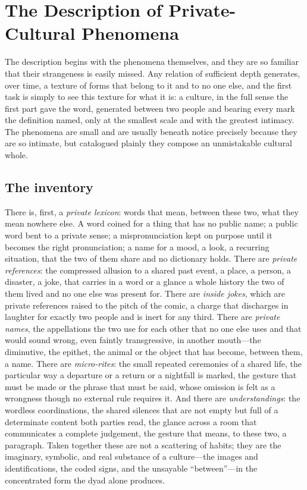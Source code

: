 \section{The Description of Private-Cultural Phenomena}
\label{p24:sec:description}

\noindent
The description begins with the phenomena themselves, and they are so familiar that their strangeness is easily missed. Any relation of sufficient depth generates, over time, a texture of forms that belong to it and to no one else, and the first task is simply to see this texture for what it is: a culture, in the full sense the first part gave the word, generated between two people and bearing every mark the definition named, only at the smallest scale and with the greatest intimacy. The phenomena are small and are usually beneath notice precisely because they are so intimate, but catalogued plainly they compose an unmistakable cultural whole.

\subsection*{The inventory}

There is, first, a \emph{private lexicon}: words that mean, between these two, what they mean nowhere else. A word coined for a thing that has no public name; a public word bent to a private sense; a mispronunciation kept on purpose until it becomes the right pronunciation; a name for a mood, a look, a recurring situation, that the two of them share and no dictionary holds. There are \emph{private references}: the compressed allusion to a shared past event, a place, a person, a disaster, a joke, that carries in a word or a glance a whole history the two of them lived and no one else was present for. There are \emph{inside jokes}, which are private references raised to the pitch of the comic, a charge that discharges in laughter for exactly two people and is inert for any third. There are \emph{private names}, the appellations the two use for each other that no one else uses and that would sound wrong, even faintly transgressive, in another mouth---the diminutive, the epithet, the animal or the object that has become, between them, a name. There are \emph{micro-rites}: the small repeated ceremonies of a shared life, the particular way a departure or a return or a nightfall is marked, the gesture that must be made or the phrase that must be said, whose omission is felt as a wrongness though no external rule requires it. And there are \emph{understandings}: the wordless coordinations, the shared silences that are not empty but full of a determinate content both parties read, the glance across a room that communicates a complete judgement, the gesture that means, to these two, a paragraph. Taken together these are not a scattering of habits; they are the imaginary, symbolic, and real substance of a culture---the images and identifications, the coded signs, and the unsayable ``between''---in the concentrated form the dyad alone produces.

